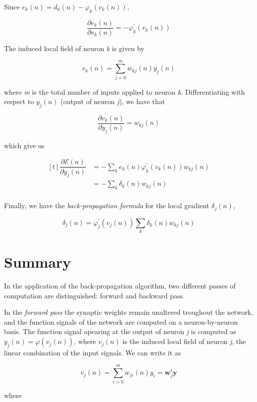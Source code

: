 \documentclass[twocolumn]{article}
\begin{document}
	Since  $ e_{k} (n) = d_{k} (n) - \varphi_{k} ( v_{k} (n)) $,

	$$ \dfrac{\partial e_{k} (n)}{\partial v_{k} (n)} = - \varphi^{'}_{k} ( v_{k} (n)) $$

	The induced local field of neuron \textit{k} is given by

	$$ v_{k} (n) = \sum_{j = 0}^{m} w_{kj} (n) y_{j} (n) $$

	\noindent where \textit{m} is the total number of inputs applied to neuron \textit{k}. Differentiating with respect to $ y_{j} (n) $ (output of neuron \textit{j}), we have that

	$$ \dfrac{\partial v_{k} (n)}{\partial y_{j} (n)} = w_{kj} (n) $$

	\noindent which give us

	$$ \begin{aligned}[t]
			\dfrac{\partial \mathcal{E} (n)}{\partial y_{j} (n)} & = - \sum_{k} e_{k} (n) \varphi^{'}_{k} ( v_{k} (n))w_{kj} (n) \\
			                                                     & = - \sum_{k} \delta_{k} (n)w_{kj} (n)                         \\
	\end{aligned} $$

	Finally, we have the \textit{back-propagation formula } for the local gradient $ \delta_{j} (n) $,

	$$ \delta_{j} (n) = \varphi^{'}_{j} ( v_{j} (n)) \sum_{k} \delta_{k} (n) w_{kj} (n) $$

\section{Summary}

In the application of the back-propagation algorithm, two different passes of computation are distinguished: forward and backward pass.

In the \textit{forward pass} the synaptic weights remain unaltered troughout the network, and the function signals of the network are computed on a neuron-by-neuron basis. The function signal apearing at the output of neuron \textit{j} is computed as $ y_{j} (n) = \varphi ( v_{j} (n)) $, where $ v_{j} (n) $ is the induced local field of neuron \textit{j}, the linear combination of the input signals. We can write it as

$$ v_{j} (n) = \sum_{i = 0}^{m} w_{ji} (n) y_{i} = \boldsymbol{w}_{j}^{t} \boldsymbol{y} $$

\noindent where
\end{document}
